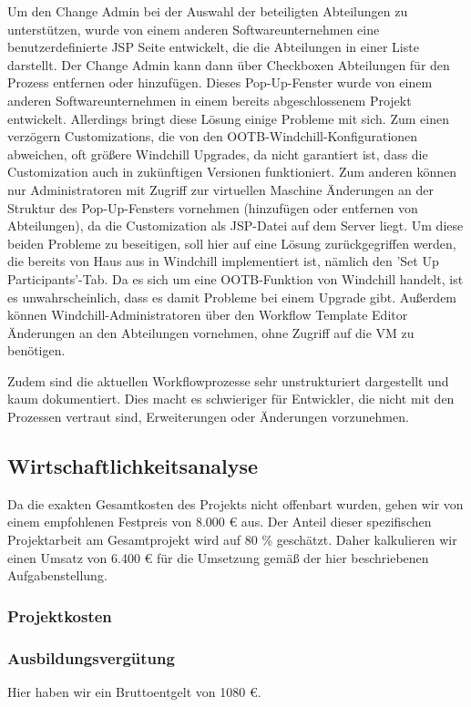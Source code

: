 Um den Change Admin bei der Auswahl der beteiligten Abteilungen zu unterstützen, wurde von einem anderen Softwareunternehmen eine benutzerdefinierte JSP Seite entwickelt, die die Abteilungen in einer Liste darstellt.
Der Change Admin kann dann über Checkboxen Abteilungen für den Prozess entfernen oder hinzufügen.
Dieses Pop-Up-Fenster wurde von einem anderen Softwareunternehmen in einem bereits abgeschlossenem Projekt entwickelt.
Allerdings bringt diese Lösung einige Probleme mit sich.
Zum einen verzögern Customizations, die von den OOTB-Windchill-Konfigurationen abweichen, oft größere Windchill Upgrades, da nicht garantiert ist, dass die Customization auch in zukünftigen Versionen funktioniert.
Zum anderen können nur Administratoren mit Zugriff zur virtuellen Maschine Änderungen an der Struktur des Pop-Up-Fensters vornehmen (\zB hinzufügen oder entfernen von Abteilungen), da die Customization als JSP-Datei auf dem Server liegt.
Um diese beiden Probleme zu beseitigen, soll hier auf eine Lösung zurückgegriffen werden, die bereits von Haus aus in Windchill implementiert ist, nämlich den 'Set Up Participants'-Tab.
Da es sich um eine OOTB-Funktion von Windchill handelt, ist es unwahrscheinlich, dass es damit Probleme bei einem Upgrade gibt.
Außerdem können Windchill-Administratoren über den Workflow Template Editor Änderungen an den Abteilungen vornehmen, ohne Zugriff auf die VM zu benötigen.

Zudem sind die aktuellen Workflowprozesse sehr unstrukturiert dargestellt und kaum dokumentiert.
Dies macht es schwieriger für Entwickler, die nicht mit den Prozessen vertraut sind, Erweiterungen oder Änderungen vorzunehmen.
\subsection{Wirtschaftlichkeitsanalyse}
\label{sec:Wirtschaftlichkeitsanalyse}

Da die exakten Gesamtkosten des Projekts nicht offenbart wurden, gehen wir von einem empfohlenen Festpreis von 8.000 € aus.
Der Anteil dieser spezifischen Projektarbeit am Gesamtprojekt wird auf 80 \% geschätzt.
Daher kalkulieren wir einen Umsatz von 6.400 € für die Umsetzung gemäß der hier beschriebenen Aufgabenstellung.

\subsubsection{Projektkosten}
\subsubsection*{Ausbildungsvergütung}
Hier haben wir ein Bruttoentgelt von 1080 €.

